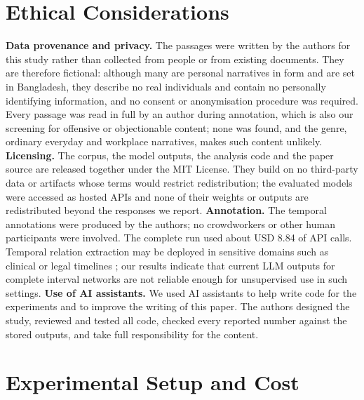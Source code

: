 \documentclass[11pt]{article}
\begin{document}
\section*{Ethical Considerations}
\textbf{Data provenance and privacy.} The passages were written by the authors for this study rather than collected from people or from existing documents. They are therefore fictional: although many are personal narratives in form and are set in Bangladesh, they describe no real individuals and contain no personally identifying information, and no consent or anonymisation procedure was required. Every passage was read in full by an author during annotation, which is also our screening for offensive or objectionable content; none was found, and the genre, ordinary everyday and workplace narratives, makes such content unlikely. \textbf{Licensing.} The corpus, the model outputs, the analysis code and the paper source are released together under the MIT License. They build on no third-party data or artifacts whose terms would restrict redistribution; the evaluated models were accessed as hosted APIs and none of their weights or outputs are redistributed beyond the responses we report. \textbf{Annotation.} The temporal annotations were produced by the authors; no crowdworkers or other human participants were involved. The complete run used about USD 8.84 of API calls. Temporal relation extraction may be deployed in sensitive domains such as clinical or legal timelines \citep{kougia-etal-2024-analysing,barale-etal-2025-lextime}; our results indicate that current LLM outputs for complete interval networks are not reliable enough for unsupervised use in such settings. \textbf{Use of AI assistants.} We used AI assistants to help write code for the experiments and to improve the writing of this paper. The authors designed the study, reviewed and tested all code, checked every reported number against the stored outputs, and take full responsibility for the content.



\appendix

\renewcommand{\topfraction}{0.9}
\renewcommand{\bottomfraction}{0.8}
\renewcommand{\dbltopfraction}{0.9}
\renewcommand{\textfraction}{0.07}
\renewcommand{\floatpagefraction}{0.8}
\renewcommand{\dblfloatpagefraction}{0.8}
\setcounter{topnumber}{3}
\setcounter{dbltopnumber}{3}
\setcounter{totalnumber}{6}

\section{Experimental Setup and Cost}
\label{app:setup}
\end{document}
